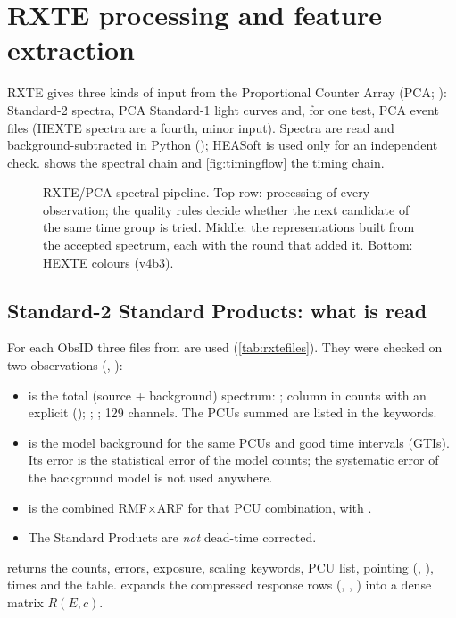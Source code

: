 \section{RXTE processing and feature extraction}\label{sec:rxte}

RXTE gives three kinds of input from the Proportional Counter Array (PCA; \citealt{Jahoda2006}): Standard-2 spectra, PCA Standard-1 light curves and, for one test, PCA event files
(HEXTE spectra are a fourth, minor input). Spectra are read and background-subtracted in Python
(); HEASoft is used only for an independent check.  shows the spectral chain and
\cref{fig:timingflow} the timing chain.

\begin{figure}[htbp]
\centering

\caption{RXTE/PCA spectral pipeline. Top row: processing of every observation; the quality rules decide whether the next
candidate of the same time group is tried. Middle: the representations built from the accepted spectrum, each with the
round that added it. Bottom: HEXTE colours (v4b3).}\label{fig:specflow}
\end{figure}

\subsection{Standard-2 Standard Products: what is read}\label{sec:pca}
For each ObsID three files from  are used (\cref{tab:rxtefiles}). They were checked on two observations
(, ):
\begin{itemize}
\item {} is the total (source + background) spectrum: ; column
 in counts with an explicit  (); ;
; 129 channels. The PCUs summed are listed in the  keywords.
\item {} is the  model background for the same PCUs and good time intervals (GTIs). Its
error is the statistical error of the model counts; the systematic error of the background model is not used anywhere.
\item {} is the combined RMF$\times$ARF for that PCU combination, with .
\item The Standard Products are \emph{not} dead-time corrected.
\end{itemize}
 returns the counts, errors, exposure, scaling keywords, PCU list, pointing (,
), times and the  table.  expands the compressed response rows
(, , ) into a dense matrix $R(E,c)$.

